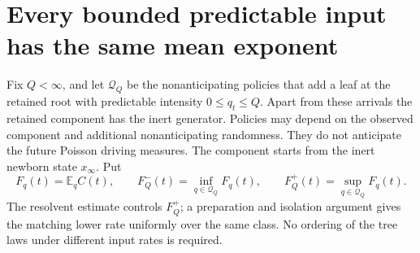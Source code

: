\section{Every bounded predictable input has the same mean exponent}
\label{bcl:section}

Fix $Q<\infty$, and let $\mathcal Q_Q$ be the nonanticipating policies
that add a leaf at the retained root with predictable intensity
$0\le q_t\le Q$.  Apart from these arrivals the retained component
has the inert generator.  Policies may depend on the observed component
and additional nonanticipating randomness.  They do not anticipate
the future Poisson driving measures.  The component starts from the
inert newborn state $x_\infty$.  Put
\[
 F_q(t)=\mathbb E_q C(t),\qquad
 F_Q^-(t)=\inf_{q\in\mathcal Q_Q}F_q(t),\qquad
 F_Q^+(t)=\sup_{q\in\mathcal Q_Q}F_q(t).
\]
The resolvent estimate controls $F_Q^+$; a preparation and isolation argument gives the matching lower rate uniformly over the same class. No ordering of the tree laws under different input rates is required.

